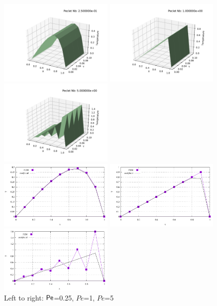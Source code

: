 \begin{center}
\includegraphics[width=5.5cm]{python_codes/fieldstone_65/results/exp1/solution1.pdf}
\includegraphics[width=5.5cm]{python_codes/fieldstone_65/results/exp1/solution2.pdf}
\includegraphics[width=5.5cm]{python_codes/fieldstone_65/results/exp1/solution3.pdf}\\
\includegraphics[width=5.5cm]{python_codes/fieldstone_65/results/exp1/T1.pdf}
\includegraphics[width=5.5cm]{python_codes/fieldstone_65/results/exp1/T2.pdf}
\includegraphics[width=5.5cm]{python_codes/fieldstone_65/results/exp1/T3.pdf}\\
{\captionfont Left to right: ${\mathsf{Pe}}$=0.25, $Pe$=1, $Pe$=5}
\end{center}

